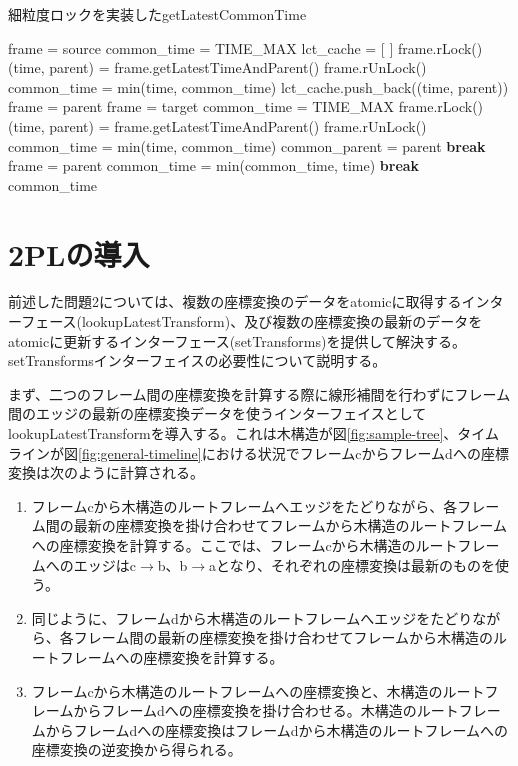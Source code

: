 \documentclass[a4paper]{jreport}	%
\begin{document}
\begin{algorithm}
\caption{細粒度ロックを実装したgetLatestCommonTime} \label{algo:getLatestCommonTime2}
\begin{algorithmic}[1]
	\State frame = source
	\State common\_time = TIME\_MAX
	\State lct\_cache = [ ] 
	\State frame.rLock()
	\State (time, parent) = frame.getLatestTimeAndParent()
	\State frame.rUnLock()
	\State common\_time = min(time, common\_time)
	\State lct\_cache.push\_back((time, parent))
	\State frame = parent
	\EndWhile
	\State frame = target
	\State common\_time = TIME\_MAX
	\State frame.rLock()
	\State (time, parent) = frame.getLatestTimeAndParent()
	\State frame.rUnLock()
	\State common\_time = min(time, common\_time)
	\State common\_parent = parent
	\State \textbf{break}
	\EndIf
	\State frame = parent
	\EndWhile
	\State common\_time = min(common\_time, time)
	\State \textbf{break}
	\EndIf
	\EndFor
	\State \Return common\_time
	\EndFunction
\end{algorithmic}
\end{algorithm}

\section{2PLの導入}
\label{section:intro-2pl}

前述した問題2については、複数の座標変換のデータをatomicに取得するインターフェース(lookupLatestTransform)、及び複数の座標変換の最新のデータをatomicに更新するインターフェース(setTransforms)を提供して解決する。setTransformsインターフェイスの必要性について説明する。

まず、二つのフレーム間の座標変換を計算する際に線形補間を行わずにフレーム間のエッジの最新の座標変換データを使うインターフェイスとしてlookupLatestTransformを導入する。これは木構造が図\ref{fig:sample-tree}、タイムラインが図\ref{fig:general-timeline}における状況でフレームcからフレームdへの座標変換は次のように計算される。

\begin{enumerate}
	\item フレームcから木構造のルートフレームへエッジをたどりながら、各フレーム間の最新の座標変換を掛け合わせてフレームから木構造のルートフレームへの座標変換を計算する。ここでは、フレームcから木構造のルートフレームへのエッジはc$\rightarrow$b、b$\rightarrow$aとなり、それぞれの座標変換は最新のものを使う。
	\item 同じように、フレームdから木構造のルートフレームへエッジをたどりながら、各フレーム間の最新の座標変換を掛け合わせてフレームから木構造のルートフレームへの座標変換を計算する。
	\item フレームcから木構造のルートフレームへの座標変換と、木構造のルートフレームからフレームdへの座標変換を掛け合わせる。木構造のルートフレームからフレームdへの座標変換はフレームdから木構造のルートフレームへの座標変換の逆変換から得られる。
\end{enumerate}
\end{document}
